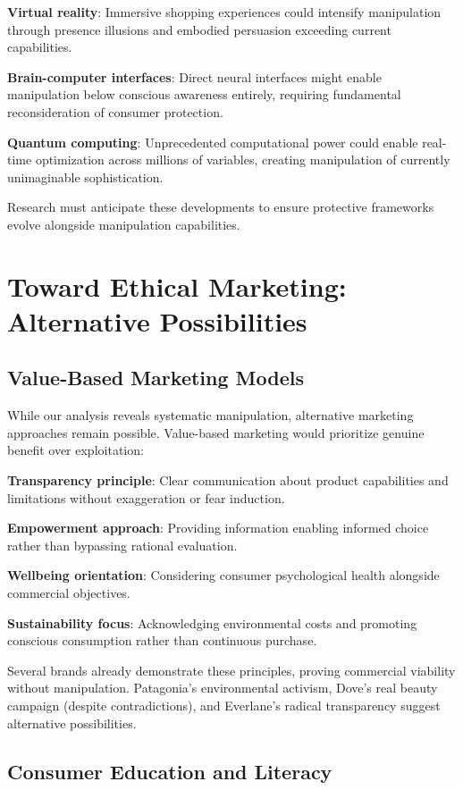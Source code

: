 \textbf{Virtual reality}: Immersive shopping experiences could intensify manipulation through presence illusions and embodied persuasion exceeding current capabilities.

\textbf{Brain-computer interfaces}: Direct neural interfaces might enable manipulation below conscious awareness entirely, requiring fundamental reconsideration of consumer protection.

\textbf{Quantum computing}: Unprecedented computational power could enable real-time optimization across millions of variables, creating manipulation of currently unimaginable sophistication.

Research must anticipate these developments to ensure protective frameworks evolve alongside manipulation capabilities.

\section{Toward Ethical Marketing: Alternative Possibilities}
\label{sec:alternatives}

\subsection{Value-Based Marketing Models}

While our analysis reveals systematic manipulation, alternative marketing approaches remain possible. Value-based marketing would prioritize genuine benefit over exploitation:

\textbf{Transparency principle}: Clear communication about product capabilities and limitations without exaggeration or fear induction.

\textbf{Empowerment approach}: Providing information enabling informed choice rather than bypassing rational evaluation.

\textbf{Wellbeing orientation}: Considering consumer psychological health alongside commercial objectives.

\textbf{Sustainability focus}: Acknowledging environmental costs and promoting conscious consumption rather than continuous purchase.

Several brands already demonstrate these principles, proving commercial viability without manipulation. Patagonia's environmental activism, Dove's real beauty campaign (despite contradictions), and Everlane's radical transparency suggest alternative possibilities.

\subsection{Consumer Education and Literacy}

